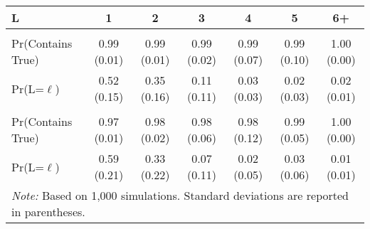 
\begin{tabular}{lcccccc}
\toprule
L & 1 & 2 & 3 & 4 & 5 & 6+\\
\midrule
\addlinespace[0.3em]
\multicolumn{7}{l}{\textbf{Deterministic}}\\
\hspace{1em}Pr(Contains True) & 0.99 (0.01) & 0.99 (0.01) & 0.99 (0.02) & 0.99 (0.07) & 0.99 (0.10) & 1.00 (0.00)\\
\hspace{1em}Pr(L=$\ell$) & 0.52 (0.15) & 0.35 (0.16) & 0.11 (0.11) & 0.03 (0.03) & 0.02 (0.03) & 0.02 (0.01)\\
\addlinespace[0.3em]
\multicolumn{7}{l}{\textbf{Probabilistic}}\\
\hspace{1em}Pr(Contains True) & 0.97 (0.01) & 0.98 (0.02) & 0.98 (0.06) & 0.98 (0.12) & 0.99 (0.05) & 1.00 (0.00)\\
\hspace{1em}Pr(L=$\ell$) & 0.59 (0.21) & 0.33 (0.22) & 0.07 (0.11) & 0.02 (0.05) & 0.03 (0.06) & 0.01 (0.01)\\
\bottomrule
\multicolumn{7}{l}{\textit{Note: } Based on 1,000 simulations. Standard deviations are reported in parentheses.}\\
\end{tabular}
